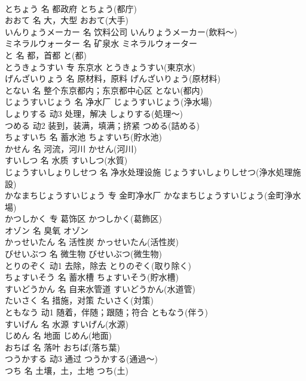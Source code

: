 \documentclass[8pt]{extreport}
\begin{document}
\begin{CJK}{UTF8}{min}
\\	とちょう	名	都政府	とちょう(都庁)	
\\	おおて	名	大，大型	おおて(大手)	
\\	いんりょうメーカー	名	饮料公司	いんりょうメーカー(飲料～)	
\\	ミネラルウォーター	名	矿泉水	ミネラルウォーター	
\\	と	名	都，首都	と(都)	
\\	とうきょうすい	专	东京水	とうきょうすい(東京水)	
\\	げんざいりょう	名	原材料，原料	げんざいりょう(原材料)	
\\	とない	名	整个东京都内；东京都中心区	とない(都内)	
\\	じょうすいじょう	名	净水厂	じょうすいじょう(浄水場)	
\\	しょりする	动3	处理，解决	しょりする(処理～)	
\\	つめる	动2	装到，装满，填满；挤紧	つめる(詰める)	
\\	ちょすいち	名	蓄水池	ちょすいち(貯水池)	
\\	かせん	名	河流，河川	かせん(河川)	
\\	すいしつ	名	水质	すいしつ(水質)	
\\	じょうすいしょりしせつ	名	净水处理设施	じょうすいしょりしせつ(浄水処理施設)	
\\	かなまちじょうすいじょう	专	金町净水厂	かなまちじょうすいじょう(金町浄水場)	
\\	かつしかく	专	葛饰区	かつしかく(葛飾区)	
\\	オゾン	名	臭氧	オゾン	
\\	かっせいたん	名	活性炭	かっせいたん(活性炭)	
\\	びせいぶつ	名	微生物	びせいぶつ(微生物)	
\\	とりのぞく	动1	去除，除去	とりのぞく(取り除く)	
\\	ちょすいそう	名	蓄水槽	ちょすいそう(貯水槽)	
\\	すいどうかん	名	自来水管道	すいどうかん(水道管)	
\\	たいさく	名	措施，对策	たいさく(対策)	
\\	ともなう	动1	随着，伴随；跟随；符合	ともなう(伴う)	
\\	すいげん	名	水源	すいげん(水源)	
\\	じめん	名	地面	じめん(地面)	
\\	おちば	名	落叶	おちば(落ち葉)	
\\	つうかする	动3	通过	つうかする(通過～)	
\\	つち	名	土壤，土，土地	つち(土)	

\end{CJK}
\end{document}

